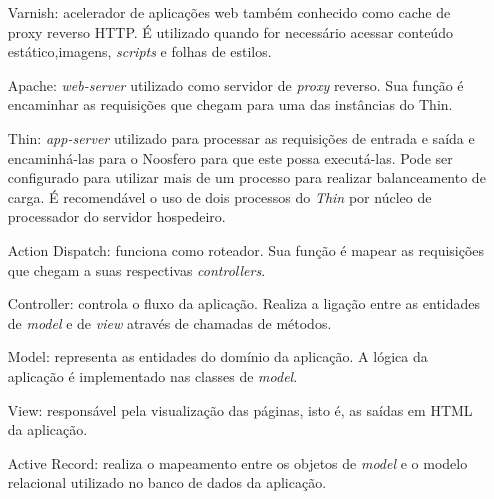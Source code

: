 \begin{itemize}
	\item[Varnish:] acelerador de aplicações web também conhecido como cache
	de proxy reverso HTTP. É utilizado quando for necessário acessar conteúdo
	estático,imagens, \textit{scripts} e folhas de estilos.
	\item[Apache:] \textit{web-server} utilizado como servidor de \textit{proxy}
	reverso. Sua função é encaminhar as requisições que chegam para uma das
	instâncias do Thin.
	\item[Thin:] \textit{app-server} utilizado para processar as requisições
	de entrada e saída e encaminhá-las para o Noosfero para que este possa
	executá-las. Pode ser configurado para utilizar mais de um processo para
	realizar balanceamento de carga. É recomendável o uso de dois processos do
	\textit{Thin} por núcleo de processador do servidor hospedeiro.
	\item[Action Dispatch:] funciona como roteador. Sua função é mapear as
	requisições que chegam a suas respectivas \textit{controllers}.
	\item[Controller:] controla o fluxo da aplicação. Realiza a ligação entre as
	entidades de \textit{model} e de \textit{view} através de chamadas de métodos.
	\item[Model:] representa as entidades do domínio da aplicação. A lógica 
	da aplicação é implementado nas classes de \textit{model}.
	\item[View:] responsável pela visualização das páginas, isto é,
	as saídas em HTML da aplicação.
	\item[Active Record:] realiza o mapeamento entre os objetos de \textit{model}
	e o modelo relacional utilizado no banco de dados da aplicação.
	
\end{itemize}






